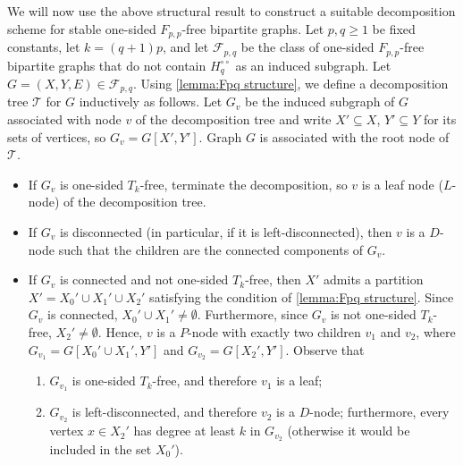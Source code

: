 \documentclass{article}
\newcommand{\cF}{\ensuremath{\mathcal{F}}}
\newcommand{\cT}{\ensuremath{\mathcal{T}}}
\begin{document}
We will now use the above structural result to construct a suitable decomposition
scheme for stable one-sided $F_{p,p}$-free bipartite graphs.
Let $p,q \geq 1$ be fixed constants, let $k = (q+1)p$, and let $\cF_{p,q}$ 
be the class of one-sided $F_{p,p}$-free bipartite graphs that do not contain $H^{\circ\circ}_q$
as an induced subgraph. 
Let $G=(X,Y,E) \in \cF_{p,q}$.
Using \cref{lemma:Fpq structure}, we define a decomposition tree $\cT$ for $G$ inductively as follows. 
Let $G_v$ be the induced subgraph of $G$ associated with node $v$ of the decomposition tree and write $X' \subseteq X$, $Y' \subseteq Y$ for its sets of vertices, so $G_v = G[X',Y']$.
Graph $G$ is associated with the root node of $\cT$.
\begin{itemize}
	\item If $G_v$ is one-sided $T_k$-free, terminate the decomposition, so $v$ is a leaf node ($L$-node) of the decomposition tree.
	\item If $G_v$ is disconnected (in particular, if it is left-disconnected), then $v$ is a $D$-node such
	that the children are the connected components of $G_v$.
	\item If $G_v$ is connected and not one-sided $T_k$-free, then $X'$ admits a partition 
	$X' = X_0' \cup X_1' \cup X_2'$ satisfying the condition of \cref{lemma:Fpq structure}.
	Since $G_v$ is connected, $X_0' \cup X_1' \neq \emptyset$. Furthermore, since 
	$G_v$ is not one-sided $T_k$-free, $X_2' \neq \emptyset$. Hence, $v$ is a $P$-node
	with exactly two children $v_1$ and $v_2$, where $G_{v_1} = G[X_0' \cup X_1', Y']$ and 
	$G_{v_2} = G[X_2', Y']$. Observe that 
	\begin{enumerate}
		\item[(1)] $G_{v_1}$ is one-sided $T_k$-free, and therefore $v_1$ is a leaf;
		\item[(2)] $G_{v_2}$ is left-disconnected, and therefore $v_2$ is a $D$-node; furthermore, every vertex $x \in X_2'$ has degree at least $k$ in $G_{v_2}$ (otherwise it would be included in the set $X_0'$).
	\end{enumerate}
\end{itemize}
\end{document}

